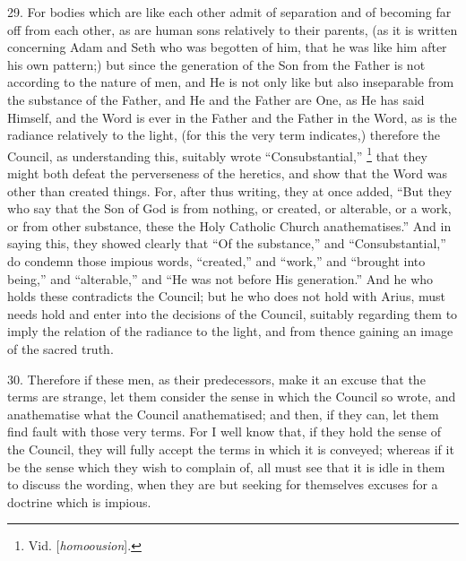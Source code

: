 29. For bodies which are like
each other admit of separation and of becoming far off from each
other, as are human sons relatively to their parents, (as it is
written concerning Adam and Seth who was begotten of him, that he was
like him after his own pattern;) but since the generation of the Son
from the Father is not according to the nature of men, and He is not
only like but also inseparable from the substance of the Father, and
He and the Father are One, as He has said Himself, and the Word is
ever in the Father and the Father in the Word, as is the radiance
relatively to the light, (for this the very term indicates,) therefore
the Council, as understanding this, suitably wrote ``Consubstantial,'' \footnote{Vid. [\emph{homoousion}].} that they might both defeat the perverseness of the heretics,
and show that the Word was other than created things. For, after thus
writing, they at once added, ``But they who say that the Son of God is
from nothing, or created, or alterable, or a work, or from other
substance, these the Holy Catholic Church anathematises.'' And in
saying this, they showed clearly that ``Of the substance,'' and ``Consubstantial,''
do condemn those impious words, ``created,'' and ``work,'' and ``brought
into being,'' and ``alterable,'' and ``He was not before His generation.''
And he who holds these contradicts the Council; but he who does not
hold with Arius, must needs hold and enter into the decisions of the
Council, suitably regarding them to imply the relation of the radiance
to the light, and from thence gaining an image of the sacred truth.

30. Therefore if these men, as
their predecessors, make it an excuse that the terms are strange, let
them consider the sense in which the Council so wrote, and
anathematise what the Council anathematised; and then, if they
can, let them find fault with those very terms. For I well know that,
if they hold the sense of the Council, they will fully accept the
terms in which it is conveyed; whereas if it be the sense which they
wish to complain of, all must see that it is idle in them to discuss
the wording, when they are but seeking for themselves excuses for a
doctrine which is impious.

